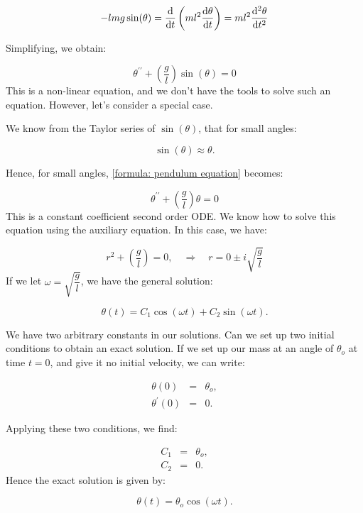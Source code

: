 \documentclass[11pt]{article}
\begin{document}
\begin{solution}
\begin{equation*}
-lmg\sin(\theta) = \dfrac{{\rm d} }{{\rm d} t} \left( ml^2 \dfrac{{\rm d} \theta}{{\rm d} t} \right) =ml^2 \dfrac{{\rm d^2} \theta}{{\rm d} t^2}
\end{equation*}

Simplifying, we obtain:

\begin{equation} \label{formula: pendulum equation}
\theta^{\prime \prime} + \left(\dfrac{g}{l} \right) \sin(\theta) = 0
\end{equation}
This is a non-linear equation, and we don't have the tools to solve such an equation. However, let's consider a special case.

We know from the Taylor series of $\sin(\theta)$, that for small angles:

\begin{equation*}
\sin(\theta) \approx \theta.
\end{equation*}

Hence, for small angles, \eqref{formula: pendulum equation} becomes:

\begin{equation} \label{formula: pendulum equation small angles}
\theta^{\prime \prime} + \left(\dfrac{g}{l} \right) \theta = 0
\end{equation}
This is a constant coefficient second order ODE. We know how to solve this equation using the auxiliary equation. In this case, we have:

\begin{equation*}
r^2 + \left(\dfrac{g}{l} \right) = 0, \quad \Rightarrow \quad r = 0 \pm i \sqrt{\dfrac{g}{l} }
\end{equation*}
If we let  $ \omega = \sqrt{\dfrac{g}{l} }$, we have the general solution:

\begin{equation*}
\theta(t) = C_{1} \cos(\omega t) + C_{2} \sin(\omega t).
\end{equation*}

We have two arbitrary constants in our solutions. Can we set up two initial conditions to obtain an exact solution. If we set up our mass at an angle of $\theta_{o}$ at time $t=0$, and give it no initial velocity, we can write:

\begin{eqnarray*}
\theta(0) & = & \theta_{o}, \\
\theta^{\prime}(0) & = & 0.
\end{eqnarray*}

Applying these two conditions, we find:

\begin{eqnarray*}
C_{1} & = & \theta_{o}, \\
C_{2} & = & 0.
\end{eqnarray*}
Hence the exact solution is given by:

\begin{equation*}
\theta(t) = \theta_{o} \cos(\omega t).
\end{equation*}
\end{solution}
\end{document}
